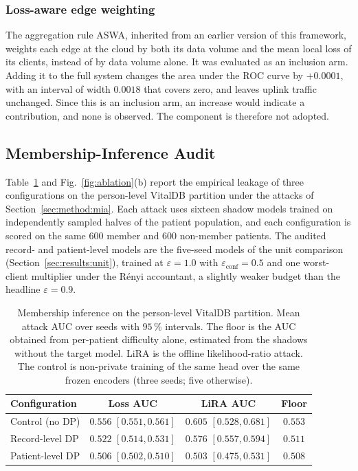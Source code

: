 \subsubsection{Loss-aware edge weighting}
The aggregation rule ASWA, inherited from an earlier version of this framework,
weights each edge at the cloud by both its data volume and the mean local loss
of its clients, instead of by data volume alone. It was evaluated as an
inclusion arm. Adding it to the full system changes the
area under the ROC curve by $+0.0001$, with an interval of width $0.0018$ that
covers zero, and leaves uplink traffic unchanged. Since this is an inclusion
arm, an increase would indicate a contribution, and none is observed. The
component is therefore not adopted.

\subsection{Membership-Inference Audit}
\label{sec:results:mia}

Table~\ref{tab:mia} and Fig.~\ref{fig:ablation}(b) report the empirical
leakage of three configurations on the person-level VitalDB partition under
the attacks of Section~\ref{sec:method:mia}. Each attack uses sixteen shadow
models trained on independently sampled halves of the patient population, and
each configuration is scored on the same $600$ member and $600$ non-member
patients. The audited record- and patient-level models are the five-seed models
of the unit comparison (Section~\ref{sec:results:unit}), trained at
$\varepsilon = 1.0$ with $\varepsilon_{\mathrm{conf}} = 0.5$ and one
worst-client multiplier under the R\'enyi accountant, a slightly weaker budget
than the headline $\varepsilon = 0.9$.

\begin{table}[!t]
\centering
\caption{Membership inference on the person-level VitalDB partition. Mean
attack AUC over seeds with $95\,\%$ intervals. The floor is the AUC obtained
from per-patient difficulty alone, estimated from the shadows without the
target model. LiRA is the offline likelihood-ratio attack. The control is
non-private training of the same head over the same frozen encoders (three
seeds; five otherwise).}
\label{tab:mia}
\small
\setlength{\tabcolsep}{2.5pt}
\begin{tabular}{lccc}
\toprule
Configuration & Loss AUC & LiRA AUC & Floor \\
\midrule
Control (no DP) & $0.556$ {\scriptsize$[0.551, 0.561]$} & $0.605$ {\scriptsize$[0.528, 0.681]$} & $0.553$ \\
Record-level DP & $0.522$ {\scriptsize$[0.514, 0.531]$} & $0.576$ {\scriptsize$[0.557, 0.594]$} & $0.511$ \\
Patient-level DP & $0.506$ {\scriptsize$[0.502, 0.510]$} & $0.503$ {\scriptsize$[0.475, 0.531]$} & $0.508$ \\
\bottomrule
\end{tabular}
\end{table}

